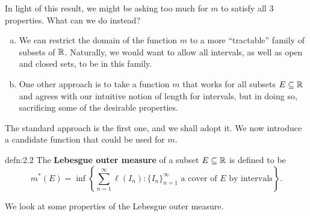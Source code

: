In light of this result, we might be asking too much for $m$ 
to satisfy all $3$ properties. What can we do instead? 
\begin{enumerate}[(a)]
    \item We can restrict the domain of the function $m$ to a 
    more ``tractable'' family of subsets of $\mathbb{R}$. Naturally, we would want to 
    allow all intervals, as well as open and closed sets, to be in this family.
    \item One other approach is to take a function $m$ that works for all 
    subsets $E \subseteq \mathbb{R}$ and agrees with our intuitive notion of length 
    for intervals, but in doing so, sacrificing some of the desirable properties. 
\end{enumerate}

The standard approach is the first one, and we shall adopt it. We now 
introduce a candidate function that could be used for $m$. 

\begin{defn}{defn:2.2}
    The {\bf Lebesgue outer measure} of a subset $E \subseteq \mathbb{R}$ is defined to be 
    \[ m^*(E) = \inf\left\{ \sum_{n=1}^\infty \ell(I_n) : \{I_n\}_{n=1}^\infty 
    \text{ a cover of $E$ by intervals}\right\}. \] 
\end{defn}

We look at some properties of the Lebesgue outer measure. 

